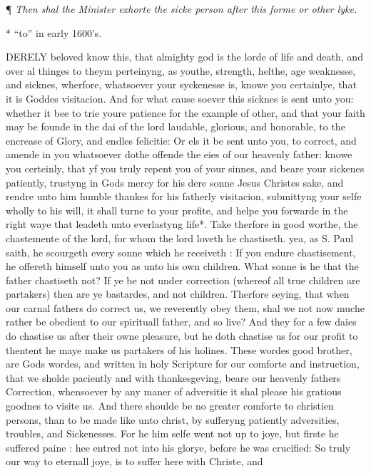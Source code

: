 ¶
\emph{Then shal the Minister exhorte the sicke person after this forme or
other lyke.}

* ``to''
in early 1600's.

DERELY
beloved know this, that almighty god is the lorde of life and death, and
over al thinges to theym perteinyng, as youthe, strength, helthe, age
weaknesse, and sicknes, wherfore, whatsoever your syckenesse is, knowe
you certainlye, that it is Goddes visitacion. And for what cause soever
this sicknes is sent unto you: whether it bee to trie youre patience for
the example of other, and that your faith may be founde in the dai of
the lord laudable, glorious, and honorable, to the encrease of Glory,
and endles felicitie: Or els it be sent unto you, to correct, and amende
in you whatsoever dothe offende the eies of our heavenly father: knowe
you certeinly, that yf you truly repent you of your sinnes, and beare
your sickenes patiently, trustyng in Gods mercy for his dere sonne Jesus
Christes sake, and rendre unto him humble thankes for his fatherly visitacion,
submittyng your selfe wholly to his will, it shall turne to your profite,
and helpe you forwarde in the right waye that leadeth unto everlastyng
life*. Take therfore in good worthe, the
chastemente of the lord, for whom the lord loveth he chastiseth. yea,
as S. Paul saith, he scourgeth every sonne which he receiveth : If you
endure chastisement, he offereth himself unto you as unto his own children.
What sonne is he that the father chastiseth not? If ye be not under correction
(whereof all true children are partakers) then are ye bastardes, and not
children. Therfore seying, that when our carnal fathers do correct us,
we reverently obey them, shal we not now muche rather be obedient to our
spirituall father, and so live? And they for a few daies do chastise us
after their owne pleasure, but he doth chastise us for our profit to thentent
he maye make us partakers of his holines. These wordes good brother, are
Gods wordes, and written in holy Scripture for our comforte and instruction,
that we sholde paciently and with thankesgeving, beare our heavenly fathers
Correction, whensoever by any maner of adversitie it shal please his gratious
goodnes to visite us. And there shoulde be no greater comforte to christien
persons, than to be made like unto christ, by sufferyng patiently adversities,
troubles, and Sickenesses. For he him selfe went not up to joye, but firste
he suffered paine : hee entred not into his glorye, before he was crucified:
So truly our way to eternall joye, is to suffer here with Christe, and
